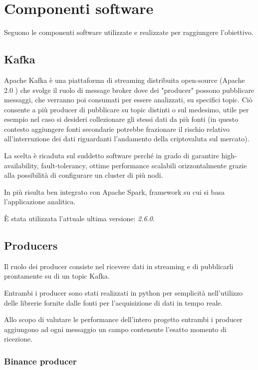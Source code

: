 \section{Componenti software}

Seguono le componenti software utilizzate e realizzate per raggiungere l'obiettivo.

\subsection{Kafka}

Apache Kafka è una piattaforma di streaming distribuita open-source
(Apache 2.0 \cite{apache2_license}) che svolge il ruolo di message broker
dove dei "producer" possono pubblicare messaggi, che verranno poi consumati per essere analizzati,
su specifici topic. Ciò consente a più producer di pubblicare su topic distinti o sul medesimo,
utile per esempio nel caso si desideri collezionare gli stessi dati da più fonti
(in questo contesto aggiungere fonti secondarie potrebbe frazionare il rischio relativo
all'interruzione dei dati riguardanti l'andamento della criptovaluta sul mercato).

La scelta è ricaduta sul suddetto software perché in grado di garantire
high-availability, fault-tolerancy, ottime performance scalabili orizzontalmente grazie
alla possibilità di configurare un cluster di più nodi. \cite{kafka_doc}

In più risulta ben integrato con Apache Spark, framework su cui si basa l'applicazione
analitica.

È stata utilizzata l'attuale ultima versione: \textit{2.6.0}.

\subsection{Producers}

Il ruolo dei producer consiste nel ricevere dati in streaming e di
pubblicarli prontamente su di un topic Kafka.

Entrambi i producer sono stati realizzati in python per semplicità nell'utilizzo delle
librerie fornite dalle fonti per l'acquisizione di dati in tempo reale.

Allo scopo di valutare le performance dell'intero progetto entrambi i producer aggiungono
ad ogni messaggio un campo contenente l'esatto momento di ricezione.

\subsubsection{Binance producer}

